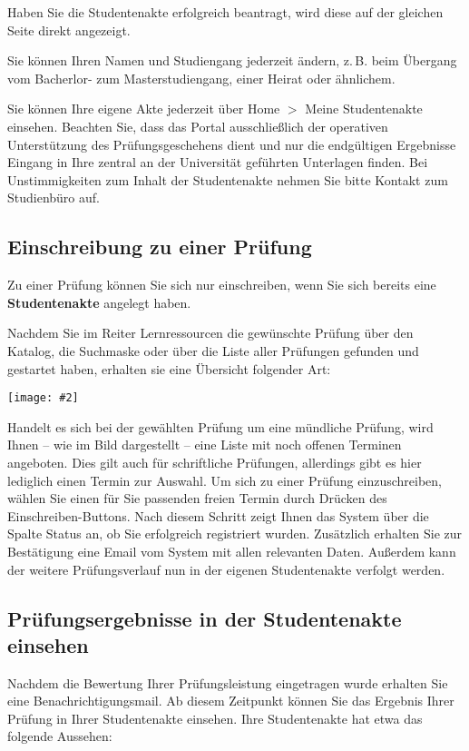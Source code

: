 \documentclass[a4paper,11pt]{article}
\newcommand{\bild}[2]{
    \begin{center}\texttt{[image: \#2]}\end{center}
}
\newcommand{\knopf}[1]{{\sc #1}}
\begin{document}
Haben Sie die Studentenakte erfolgreich beantragt, wird diese auf der gleichen
Seite direkt angezeigt.

Sie können Ihren Namen und Studiengang jederzeit ändern, z.\,B. beim
Übergang vom Bacherlor- zum Masterstudiengang, einer Heirat oder ähnlichem.

Sie können Ihre eigene Akte jederzeit über \knopf{Home $>$ Meine Studentenakte}
einsehen. Beachten Sie, dass das Portal ausschließlich der operativen
Unterstützung des Prüfungsgeschehens dient und nur die endgültigen Ergebnisse
Eingang in Ihre zentral an der Universität geführten Unterlagen finden. Bei
Unstimmigkeiten zum Inhalt der Studentenakte nehmen Sie bitte Kontakt zum Studienbüro
auf.

\subsection{Einschreibung zu einer Prüfung}

Zu einer Prüfung können Sie sich nur einschreiben, wenn Sie sich bereits eine
{\bf Studentenakte} angelegt haben.

Nachdem Sie im Reiter \knopf{Lernressourcen} die gewünschte Prüfung über den
Katalog, die Suchmaske oder über die Liste aller Prüfungen gefunden und
gestartet haben, erhalten sie eine Übersicht folgender Art:

\bild{1}{Pruefung-Einschreiben}

Handelt es sich bei der gewählten Prüfung um eine mündliche Prüfung, wird
Ihnen -- wie im Bild dargestellt -- eine Liste mit noch offenen Terminen
angeboten.  Dies gilt auch für schriftliche Prüfungen, allerdings gibt es hier
lediglich einen Termin zur Auswahl. Um sich zu einer Prüfung einzuschreiben,
wählen Sie einen für Sie passenden freien Termin durch Drücken des
\knopf{Einschreiben}-Buttons. Nach diesem Schritt zeigt Ihnen das System über die
Spalte \knopf{Status} an, ob Sie erfolgreich registriert wurden. Zusätzlich erhalten Sie
zur Bestätigung eine Email vom System mit allen relevanten Daten. Außerdem kann der
weitere Prüfungsverlauf nun in der eigenen Studentenakte verfolgt werden.
 
\subsection{Prüfungsergebnisse in der Studentenakte einsehen}

Nachdem die Bewertung Ihrer Prüfungsleistung eingetragen wurde
erhalten Sie eine Benachrichtigungsmail. Ab diesem Zeitpunkt können Sie
das Ergebnis Ihrer Prüfung in Ihrer Studentenakte einsehen.  Ihre Studentenakte hat etwa
das folgende Aussehen:
\end{document}
